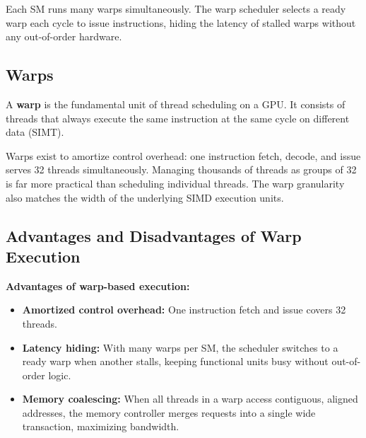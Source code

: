 \begin{remark}
    Each SM runs many warps simultaneously. The warp scheduler selects a ready warp each cycle to issue instructions, hiding the latency of stalled warps without any out-of-order hardware.
\end{remark}

\subsection{Warps}

\begin{definition}
    A \textbf{warp} is the fundamental unit of thread scheduling on a GPU. It consists of threads that always execute the same instruction at the same cycle on different data (SIMT). 
\end{definition}

\begin{remark}
    Warps exist to amortize control overhead: one instruction fetch, decode, and issue serves 32 threads simultaneously. Managing thousands of threads as groups of 32 is far more practical than scheduling individual threads. The warp granularity also matches the width of the underlying SIMD execution units.
\end{remark}

\subsection{Advantages and Disadvantages of Warp Execution}

\begin{theorem}
    \textbf{Advantages of warp-based execution:}
    \begin{itemize}
        \item \textbf{Amortized control overhead:} One instruction fetch and issue covers 32 threads.
        \item \textbf{Latency hiding:} With many warps per SM, the scheduler switches to a ready warp when another stalls, keeping functional units busy without out-of-order logic.
        \item \textbf{Memory coalescing:} When all threads in a warp access contiguous, aligned addresses, the memory controller merges requests into a single wide transaction, maximizing bandwidth.
    \end{itemize}
\end{theorem}

